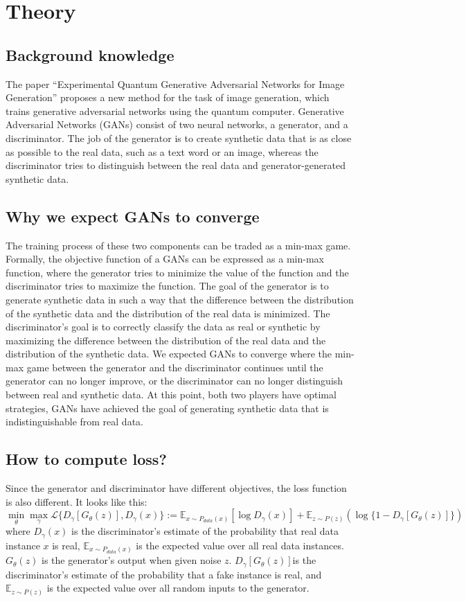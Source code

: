 \section{Theory}
\subsection{Background knowledge}
The paper “Experimental Quantum Generative Adversarial Networks for Image Generation” proposes a new method for the task of image generation, which trains generative adversarial networks using the quantum computer. Generative Adversarial Networks (GANs) consist of two neural networks, a generator, and a discriminator. The job of the generator is to create synthetic data that is as close as possible to the real data, such as a text word or an image, whereas the discriminator tries to distinguish between the real data and generator-generated synthetic data. 

\subsection{Why we expect GANs to converge}
The training process of these two components can be traded as a min-max game. Formally, the objective function of a GANs can be expressed as a min-max function, where the generator tries to minimize the value of the function and the discriminator tries to maximize the function. The goal of the generator is to generate synthetic data in such a way that the difference between the distribution of the synthetic data and the distribution of the real data is minimized. The discriminator's goal is to correctly classify the data as real or synthetic by maximizing the difference between the distribution of the real data and the distribution of the synthetic data. We expected GANs to converge where the min-max game between the generator and the discriminator continues until the generator can no longer improve, or the discriminator can no longer distinguish between real and synthetic data. At this point, both two players have optimal strategies, GANs have achieved the goal of generating synthetic data that is indistinguishable from real data. 

\subsection{How to compute loss?}
Since the generator and discriminator have different objectives, the loss function is also different. It looks like this:
\[\min\limits_{\theta} \max\limits_{\gamma} \mathcal{L}\{D_{\gamma}{[G_{\theta}(z)], D_{\gamma}(x)}\} := \mathbb{E}_{x \sim P_{data}(x)}[\log D_{\gamma}(x)] + \mathbb{E}_{z \sim P(z)}(\log\{1 - D_{\gamma}[G_{\theta}(z)]\})\]
where $D_{\gamma}(x)$ is the discriminator's estimate of the probability that real data instance $x$ is real, $\mathbb{E}_{x \sim P_{data}(x)}$ is the expected value over all real data instances. $G_{\theta}(z)$ is the generator's output when given noise $z$. $D_{\gamma}[G_{\theta}(z)]$is the discriminator's estimate of the probability that a fake instance is real, and $\mathbb{E}_{z \sim P(z)}$ is the expected value over all random inputs to the generator. 


